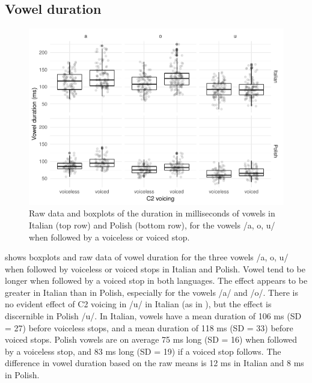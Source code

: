 \documentclass[12pt,]{article}
\begin{document}
\hypertarget{vowel-duration}{%
\subsection{Vowel duration}\label{vowel-duration}}

\label{s:vduration}

\begin{figure}
\includegraphics[width=\linewidth]{2018-relrel_files/figure-latex/Figure2} \caption{Raw data and boxplots of the duration in milliseconds of vowels in Italian (top row) and Polish (bottom row), for the vowels /a, o, u/ when followed by a voiceless or voiced stop.}\label{f:Figure2}
\end{figure}

 shows boxplots and raw data of vowel duration for the
three vowels /a, o, u/ when followed by voiceless or voiced stops in
Italian and Polish. Vowel tend to be longer when followed by a voiced
stop in both languages. The effect appears to be greater in Italian than
in Polish, especially for the vowels /a/ and /o/. There is no evident
effect of C2 voicing in /u/ in Italian (as in \citealt{ferrero1978}),
but the effect is discernible in Polish /u/. In Italian, vowels have a
mean duration of 106 ms (SD = 27) before voiceless stops, and a mean
duration of 118 ms (SD = 33) before voiced stops. Polish vowels are on
average 75 ms long (SD = 16) when followed by a voiceless stop, and 83
ms long (SD = 19) if a voiced stop follows. The difference in vowel
duration based on the raw means is 12 ms in Italian and 8 ms in Polish.
\end{document}
